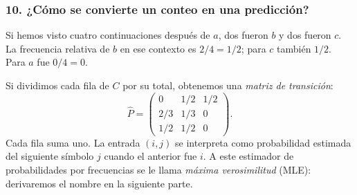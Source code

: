 \subsubsection*{10. ¿Cómo se convierte un conteo en una predicción?}
Si hemos visto cuatro continuaciones después de $a$, dos fueron $b$ y dos fueron $c$. La frecuencia relativa de $b$ en ese contexto es $2/4=1/2$; para $c$ también $1/2$. Para $a$ fue $0/4=0$.
\begin{center}
\end{center}
Si dividimos cada fila de $C$ por su total, obtenemos una \emph{matriz de transición}:
\[
\widehat P=\begin{pmatrix}0&1/2&1/2\\2/3&1/3&0\\1/2&1/2&0\end{pmatrix}.
\]
Cada fila suma uno. La entrada $(i,j)$ se interpreta como probabilidad estimada del siguiente símbolo $j$ cuando el anterior fue $i$. A este estimador de probabilidades por frecuencias se le llama \emph{máxima verosimilitud} (MLE): derivaremos el nombre en la siguiente parte.

